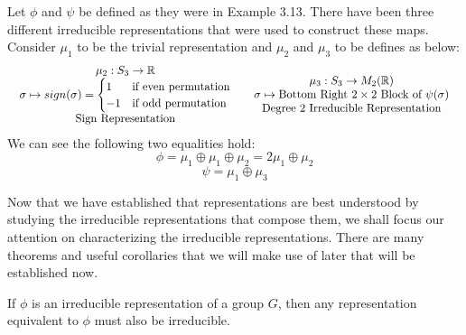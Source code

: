 \begin{example}\end{example}
	Let $\phi$ and $\psi$ be defined as they were in Example 3.13. There have been three different irreducible representations that were used to construct these maps. Consider $\mu_1$ to be the trivial representation and $\mu_2$ and $\mu_3$ to be defines as below:
$$\begin{array}{c c}
	\begin{array}{c}
		\mu_2 : S_3 \rightarrow \mathbb{R} \\
		\sigma \mapsto sign(\sigma) = \begin{cases}
										1 & \text{if even permutation} \\
										-1 & \text{if odd permutation}
									   \end{cases}\\
		\text{Sign Representation}
	\end{array}
&
	\begin{array}{c}
		\mu_3 : S_3 \rightarrow M_2(\mathbb{R}) \\
		\sigma \mapsto \text{Bottom Right } 2\times2 \text{ Block of } \psi(\sigma)\\
		\text{Degree 2 Irreducible Representation}
	\end{array}
\end{array}$$
We can see the following two equalities hold:
$$\phi = \mu_1 \oplus \mu_1 \oplus \mu_2 = 2\mu_1 \oplus \mu_2$$
$$\psi = \mu_1 \oplus \mu_3$$

Now that we have established that representations are best understood by studying the irreducible representations that compose them, we shall focus our attention on characterizing the irreducible representations. There are many theorems and useful corollaries that we will make use of later that will be established now.

\begin{theorem}
	If $\phi$ is an irreducible representation of a group $G$, then any representation equivalent to $\phi$ must also be irreducible.
\end{theorem}

